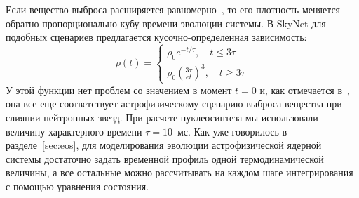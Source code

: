 Если вещество выброса расширяется равномерно~\cite{korobkin2012,lippuner2015}, то его плотность меняется обратно пропорционально кубу времени эволюции системы. В SkyNet для подобных сценариев предлагается кусочно-определенная зависимость:
\begin{equation}
\displaystyle
\rho(t) = \begin{cases}
\rho_0 e^{-t/\tau}, \quad t \leq 3\tau\\
\rho_0 \left( \frac{3\tau}{et} \right)^3, \quad t \geq 3\tau
\end{cases}
\end{equation}
У этой функции нет проблем со значением в момент $t=0$ и, как отмечается в~\cite{lippuner2015}, она все еще соответствует астрофизическому сценарию выброса вещества при слиянии нейтронных звезд. При расчете нуклеосинтеза мы использовали величину характерного времени $\tau = 10$~мс. Как уже говорилось в разделе~\ref{sec:eos}, для моделирования эволюции астрофизической ядерной системы достаточно задать временной профиль одной термодинамической величины, а все остальные можно рассчитывать на каждом шаге интегрирования с помощью уравнения состояния.
